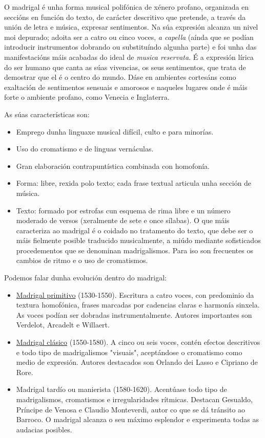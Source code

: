 \documentclass[
]{article}
\begin{document}
O madrigal é unha forma musical polifónica de xénero profano, organizada
en seccións en función do texto, de carácter descritivo que pretende, a
través da unión de letra e música, expresar sentimentos. Na súa
expresión alcanza un nivel moi depurado; adoita ser a catro ou cinco
voces, \emph{a capella} (aínda que se podían introducir instrumentos
dobrando ou substituíndo algunha parte) e foi unha das manifestacións
máis acabadas do ideal de \emph{musica reservata}. É a expresión lírica
do ser humano que canta as súas vivencias, os seus sentimentos, que
trata de demostrar que el é o centro do mundo. Dáse en ambientes
cortesáns como exaltación de sentimentos sensuais e amorosos e naqueles
lugares onde é máis forte o ambiente profano, como Venecia e Inglaterra.

As súas características son:

\begin{itemize}
\item
  Emprego dunha linguaxe musical difícil, culto e para minorías.
\item
  Uso do cromatismo e de linguas vernáculas.
\item
  Gran elaboración contrapuntística combinada con homofonía.
\item
  Forma: libre, rexida polo texto; cada frase textual articula unha
  sección de música.
\item
  Texto: formado por estrofas cun esquema de rima libre e un número
  moderado de versos (xeralmente de sete e once sílabas). O que máis
  caracteriza ao madrigal é o coidado no tratamento do texto, que debe
  ser o máis fielmente posible traducido musicalmente, a miúdo mediante
  sofisticados procedementos que se denominan madrigalismos. Para iso
  son frecuentes os cambios de ritmo e o uso de cromatismos.
\end{itemize}

Podemos falar dunha evolución dentro do madrigal:

\begin{itemize}
\item
  \href{http://open.spotify.com/track/0fmcNVwu3fbEqcoHCx13X0}{Madrigal
  primitivo} (1530-1550). Escritura a catro voces, con predominio da
  textura homofónica, frases marcadas por cadencias claras e harmonía
  sinxela. As voces podían ser dobradas instrumentalmente. Autores
  importantes son Verdelot, Arcadelt e Willaert.
\item
  \href{http://open.spotify.com/track/1pb7MyBUi3pZnbxwoSu2yu}{Madrigal
  clásico} (1550-1580). A cinco ou seis voces, contén efectos
  descritivos e todo tipo de madrigalismos "visuais", aceptándose o
  cromatismo como medio de expresión. Autores destacados son Orlando dei
  Lasso e Cipriano de Rore.
\item
  Madrigal tardío ou manierista (1580-1620). Acentúase todo tipo de
  madrigalismos, cromatismos e irregularidades rítmicas. Destacan
  Gesualdo, Príncipe de Venosa e Claudio Monteverdi, autor co que se dá
  tránsito ao Barroco. O madrigal alcanza o seu máximo esplendor e
  experimenta todas as audacias posibles.
\end{itemize}
\end{document}
